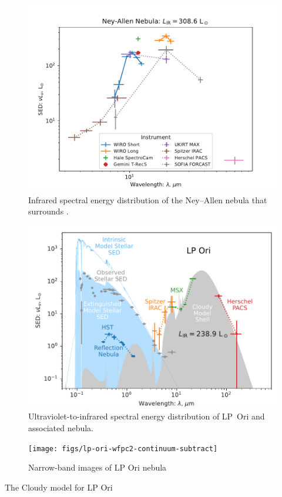 \begin{figure}
  \centering
  \includegraphics[width=\linewidth]{figs/ney-allen-sed}
  \caption{Infrared spectral energy distribution of the Ney--Allen
    nebula that surrounds \thD. }
  \label{fig:ney-allen-sed}
\end{figure}


\begin{figure}
  \centering
  \includegraphics[width=\linewidth]{figs/lp-ori-sed-edited}
  \caption{Ultraviolet-to-infrared spectral energy distribution of LP~Ori
    and associated nebula. }
  \label{fig:lp-ori-sed}
\end{figure}

\begin{figure}
  \centering
  \texttt{[image: figs/lp-ori-wfpc2-continuum-subtract]}
  \caption{Narrow-band images of LP Ori nebula }
  \label{fig:lp-ori-sed}
\end{figure}

The Cloudy model for LP Ori


